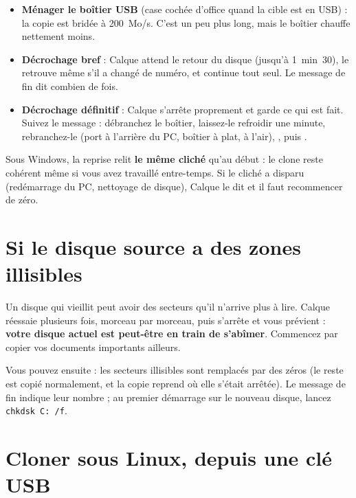 \begin{itemize}
\item \textbf{Ménager le boîtier USB} (case cochée d'office quand la cible est en USB) : la copie est
      bridée à 200~Mo/s. C'est un peu plus long, mais le boîtier chauffe nettement moins.
\item \textbf{Décrochage bref} : Calque attend le retour du disque (jusqu'à 1~min~30), le retrouve
      même s'il a changé de numéro, et continue tout seul. Le message de fin dit combien de fois.
\item \textbf{Décrochage définitif} : Calque s'arrête proprement et garde ce qui est fait. Suivez le
      message : débranchez le boîtier, laissez-le refroidir une minute, rebranchez-le (port à
      l'arrière du PC, boîtier à plat, à l'air), , puis .
\end{itemize}


Sous Windows, la reprise relit \textbf{le même cliché} qu'au début : le clone reste cohérent même si
vous avez travaillé entre-temps. Si le cliché a disparu (redémarrage du PC, nettoyage de disque),
Calque le dit et il faut recommencer de zéro.


\section{Si le disque source a des zones illisibles}

Un disque qui vieillit peut avoir des secteurs qu'il n'arrive plus à lire. Calque réessaie plusieurs
fois, morceau par morceau, puis s'arrête et vous prévient : \textbf{votre disque actuel est peut-être
en train de s'abîmer}. Commencez par copier vos documents importants ailleurs.

Vous pouvez ensuite  : les secteurs illisibles sont remplacés par des
zéros (le reste est copié normalement, et la copie reprend où elle s'était arrêtée). Le message de fin
indique leur nombre ; au premier démarrage sur le nouveau disque, lancez \texttt{chkdsk C: /f}.

\section{Cloner sous Linux, depuis une clé USB}\label{sec:linux}

